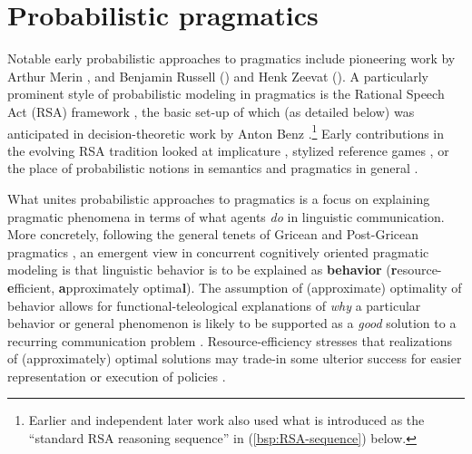 \documentclass[fleqn,reqno,12pt]{article}
\begin{document}
\section{Probabilistic pragmatics}
\label{sec:prob-pragm}

Notable early probabilistic approaches to pragmatics include pioneering work by Arthur Merin \citeyear{Merin1994:Algebra-of-Elem,MerinInfoRelSocialDecisionmaking1999}, and Benjamin Russell (\citeyear{Russell2012:Probabilistic-R}) and Henk Zeevat (\citeyear{Zeevat2014:Language-Produc}).
A particularly prominent style of probabilistic modeling in pragmatics is the Rational Speech Act (RSA) framework \citep{FrankGoodman2012:Predicting-Prag,ScontrasTessler2021:A-practical-int,Degen2023:The-Rational-Sp}, the basic set-up of which (as detailed below) was anticipated in decision-theoretic work by Anton Benz \citep{BenzUtil&RelAns2005,BenzvanRooijOptimalAssertions2007}.\footnote{
  Earlier \citep[e.g.][]{KipperJameson1994:Semantics-and-P} and independent later work \citep[e.g.,][]{TellexKnepper2014:Asking-for-Help} also used what is introduced as the ``standard RSA reasoning sequence'' in (\ref{bsp:RSA-sequence}) below.
}
Early contributions in the evolving RSA tradition looked at
implicature \citep{BergenLevy2012:Thats-what-she-,GoodmanStuhlmuller2013:Knowledge-and-I},
stylized reference games \citep{FrankGoodman2012:Predicting-Prag,DegenFranke2012:Optimal-Reasoni,DegenFranke2013:Cost-Based-Prag}
, or
the place of probabilistic notions in semantics and pragmatics in general \citep{GoodmanLassiter2014:Probabilistic-S}.

What unites probabilistic approaches to pragmatics is a focus on explaining pragmatic phenomena in terms of what agents \emph{do} in linguistic communication.
More concretely, following the general tenets of Gricean \citep{Grice1975:Logic-and-Conve} and Post-Gricean pragmatics \citep{SperberWilson1995:Relevance:-Comm,WilsonSperber2004:Relevance-Theor,BlutnerZeevat2004:Optimality-Theo}, an emergent view in concurrent cognitively oriented pragmatic modeling is that linguistic behavior is to be explained as \textbf{ behavior} (\textbf{r}esource-\textbf{e}fficient, \textbf{a}pproximately optima\textbf{l}).
The assumption of (approximate) optimality of behavior allows for functional-teleological explanations of \emph{why} a particular behavior or general phenomenon is likely to be supported as a \emph{good} solution to a recurring communication problem \citep[e.g.,][]{NowakKrakauer1999:The-Evolution-o,Skyrms2010:Signals}.
Resource-efficiency stresses that realizations of (approximately) optimal solutions may trade-in some ulterior success for easier representation or execution of policies \citep[e.g.,][]{LiederGriffiths2019:Resource-ration,LaiGershman2024:Human-decision-}.
\end{document}
